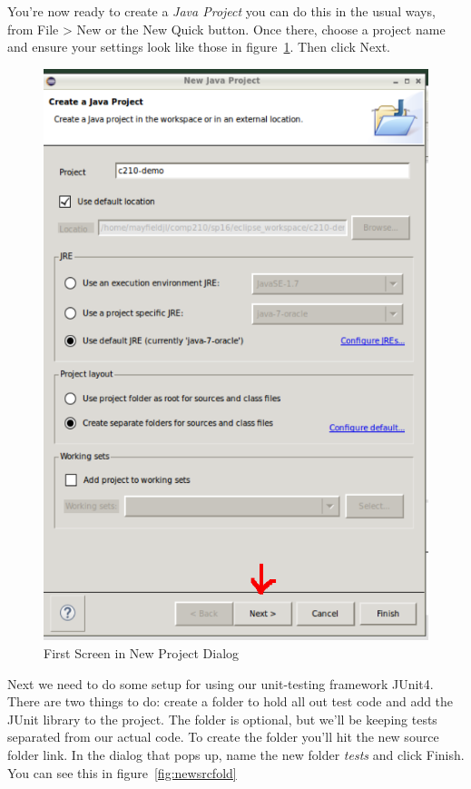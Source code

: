 \documentclass[nobib]{tufte-handout}
\begin{document}
You're now ready to create a \textit{Java Project} you can do this in the usual ways, from File > New or the New Quick button. Once there, choose a project name and ensure your settings look like those in figure~\ref{fig:newproj}. Then click Next.

\vspace{.1in}
\begin{center}
\begin{figure}[!htb]
\includegraphics[scale=.3]{Eclipse-NewProject.png}
\caption{First Screen in New Project Dialog}
\label{fig:newproj}
\end{figure}
\end{center}
\vspace{.1in}

Next we need to do some setup for using our unit-testing framework JUnit4. There are two things to do: create a folder to hold all out test code and add the JUnit library to the project. The folder is optional, but we'll be keeping tests separated from our actual code. To create the folder you'll hit the new source folder link. In the dialog that pops up, name the new folder \textit{tests} and click Finish. You can see this in figure~\ref{fig:newsrcfold}
\end{document}
